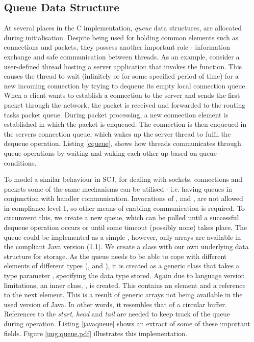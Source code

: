 \subsection{Queue Data Structure} %
\label{sub:queue}
At several places in the C implementation, \textit{queue} data structures, are allocated during initialisation. Despite being used for holding common elements such as connections and packets, they possess another important role - information exchange and safe communication between threads. As an example, consider a user-defined thread hosting a server application that invokes the  function. This causes the thread to wait (infinitely or for some specified period of time) for a new incoming connection by trying to dequeue its empty local connection queue. When a client wants to establish a connection to the server and sends the first packet through the network, the packet is received and forwarded to the routing tasks packet queue. During packet processing, a new connection element is established in which the packet is enqueued. The connection is then enqueued in the servers connection queue, which wakes up the server thread to fulfil the dequeue operation. Listing \ref{cqueue}, shows how threads communicates through queue operations by waiting and waking each other up based on queue conditions.



To model a similar behaviour in SCJ, for dealing with sockets, connections and packets some of the same mechanisms can be utilised - i.e. having queues in conjunction with handler communication. Invocations of ,  and , are not allowed in compliance level 1, so other means of enabling communication is required. To circumvent this, we create a new queue, which can be polled until a successful dequeue operation occurs or until some timeout (possibly none) takes place. The queue could be implemented as a simple , however, only arrays are available in the compliant Java version (1.1). We create a  class with our own underlying data structure for storage. As the queue needs to be able to cope with different elements of different types (,  and ), it is created as a generic class that takes a type parameter , specifying the data type stored. Again due to language version limitations, an inner class, , is created. This contains an element and a reference to the next element. This is a result of generic arrays not being available in the used version of Java. In other words, it resembles that of a circular buffer. References to the \textit{start}, \textit{head} and \textit{tail} are needed to keep track of the queue during operation. Listing \ref{javaqueue} shows an extract of some of these important fields. Figure \ref{img:queue.pdf} illustrates this implementation.

